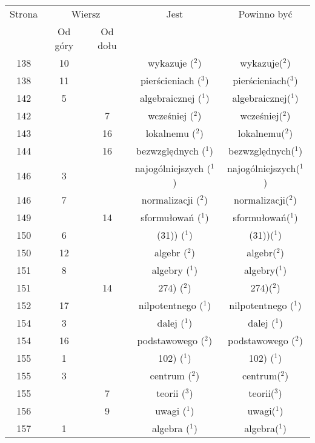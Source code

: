 \documentclass[a4paper,11pt]{article}
\numberwithin{equation}{section}
\begin{document}
\begin{center}
  \begin{tabular}{|c|c|c|c|c|}
    \hline
    Strona & \multicolumn{2}{c|}{Wiersz} & Jest
                              & Powinno być \\ \cline{2-3}
    & Od góry & Od dołu & & \\
    \hline
    138 & 10 & & wykazuje ($^{ 2 }$) & wykazuje($^{ 2 }$) \\
    138 & 11 & & pierścieniach ($^{ 3 }$) & pierścieniach($^{ 3 }$) \\
    142 & \hphantom{0}5 & & algebraicznej ($^{ 1 }$)
    & algebraicznej($^{ 1 }$) \\
    142 & & \hphantom{0}7 & wcześniej ($^{ 2 }$) & wcześniej($^{ 2 }$) \\
    143 & & 16 & lokalnemu ($^{ 2 }$) & lokalnemu($^{ 2 }$) \\
    144 & & 16 & bezwzględnych ($^{ 1 }$) & bezwzględnych($^{ 1 }$) \\
    146 & \hphantom{0}3 & & najogólniejszych ($^{ 1 }$)
    & najogólniejszych($^{ 1 }$) \\
    146 & \hphantom{0}7 & & normalizacji ($^{ 2 }$)
    & normalizacji($^{ 2 }$) \\
    149 & & 14 & sformułowań ($^{ 1 }$) & sformułowań($^{ 1 }$) \\
    150 & \hphantom{0}6 & & (31)) ($^{ 1 }$) & (31))($^{ 1 }$) \\
    150 & 12 & & algebr ($^{ 2 }$) & algebr($^{ 2 }$) \\
    151 & \hphantom{0}8 & & algebry ($^{ 1 }$) & algebry($^{ 1 }$) \\
    151 & & 14 & 274) ($^{ 2 }$) & 274)($^{ 2 }$) \\
    152 & 17 & & nilpotentnego ($^{ 1 }$) & nilpotentnego ($^{ 1 }$) \\
    154 & \hphantom{0}3 & & dalej ($^{ 1 }$) & dalej ($^{ 1 }$) \\
    154 & 16 & & podstawowego ($^{ 2 }$) & podstawowego ($^{ 2 }$) \\
    155 & \hphantom{0}1 & & 102) ($^{ 1 }$) & 102) ($^{ 1 }$) \\
    155 & \hphantom{0}3 & & centrum ($^{ 2 }$) & centrum($^{ 2 }$) \\
    155 & & \hphantom{0}7 & teorii ($^{ 3 }$) & teorii($^{ 3 }$) \\
    156 & & \hphantom{0}9 & uwagi ($^{ 1 }$) & uwagi($^{ 1 }$) \\
    157 & \hphantom{0}1 & & algebra ($^{ 1 }$) & algebra($^{ 1 }$) \\

\end{tabular}
\end{center}
\end{document}
